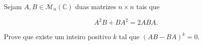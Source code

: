 Sejam \(A,B\in \mathcal{M}_n(\mathbb{C})\) duas matrizes \(n \times n\) tais que 

\[
A^2B+BA^2=2ABA.
\]

Prove que existe um inteiro positivo \(k\) tal que \( (AB-BA)^k = 0 \).
